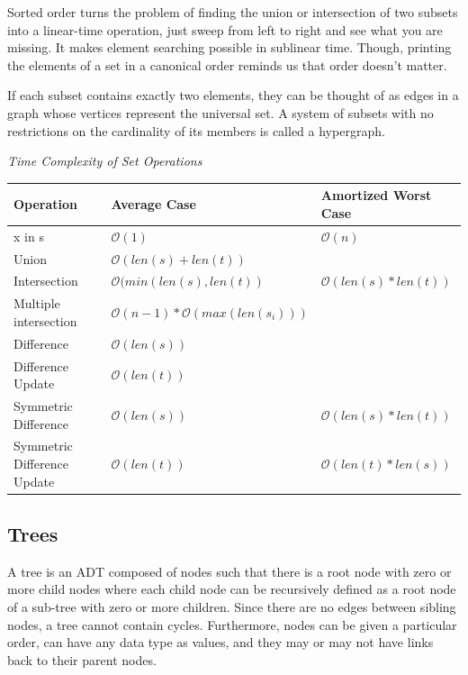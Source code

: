 \documentclass{article}
\newcommand{\bigO}{\mathcal{O}}
\begin{document}
    Sorted order turns the problem of finding the union or intersection of two subsets into a linear-time operation, just sweep from left to right and see what you are missing. It makes element searching possible in sublinear time. Though, printing the elements of a set in a canonical order reminds us that order doesn’t matter.
    
    If each subset contains exactly two elements, they can be thought of as edges in a graph whose vertices represent the universal set. A system of subsets with no restrictions on the cardinality of its members is called a hypergraph.
    
    \vspace{8pt} \emph{Time Complexity of Set Operations}
    \begin{table}[H]
        \begin{tabular}{|l|l|l|}
            \hline
            \textbf{Operation} & \textbf{Average Case} & \textbf{Amortized Worst Case} \\
            \hline
            x in s & $\bigO(1)$ & $\bigO(n)$ \\
            Union & $\bigO(len(s)+len(t))$  & \\
            Intersection & $\bigO(min(len(s), len(t))$ & $\bigO(len(s) * len(t))$ \\
            Multiple intersection & $\bigO(n-1)*\bigO(max(len(s_i)))$ &\\
            Difference & $\bigO(len(s))$ & \\
            Difference Update & $\bigO(len(t))$ & \\
            Symmetric Difference & $\bigO(len(s))$ & $\bigO(len(s) * len(t))$ \\
            Symmetric Difference Update & $\bigO(len(t))$ & $\bigO(len(t) * len(s))$\\
            \hline
        \end{tabular}
    \end{table}

    \subsection{Trees}
    A tree is an ADT composed of nodes such that there is a root node with zero or more child nodes where each child node can be recursively defined as a root node of a sub-tree with zero or more children. Since there are no edges between sibling nodes, a tree cannot contain cycles. Furthermore, nodes can be given a particular order, can have any data type as values, and they may or may not have links back to their parent nodes.
    
\end{document}
